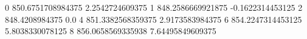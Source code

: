 0 850.6751708984375 2.2542724609375
1 848.2586669921875 -0.1622314453125
2 848.4208984375 0.0
4 851.3382568359375 2.9173583984375
6 854.2247314453125 5.8038330078125
8 856.0658569335938 7.64495849609375
